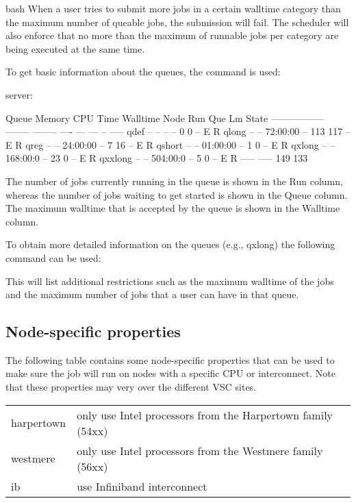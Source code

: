 \begin{code}{bash}
When a user tries to submit more jobs in a certain walltime category than the
maximum number of queable jobs, the submission will fail. The scheduler will
also enforce that no more than the maximum of runnable jobs per category are
being executed at the same time.

To get basic information about the queues, the command  is used:

\begin{prompt}
server: %

Queue      Memory CPU Time Walltime Node  Run Que Lm  State
----------------- -------- -------- ----  --- --- --  -----
qdef         --      --       --      --    0   0 --   E R
qlong        --      --    72:00:00   --  113 117 --   E R
qreg         --      --    24:00:00   --    7  16 --   E R
qshort       --      --    01:00:00   --    1   0 --   E R
qxlong       --      --    168:00:0   --   23   0 --   E R
qxxlong      --      --    504:00:0   --    5   0 --   E R
                                         ----- -----
                                          149  133
\end{prompt}

The number of jobs currently running in the queue is shown in the Run column,
whereas the number of jobs waiting to get started is shown in the Queue column.
The maximum walltime that is accepted by the queue is shown in the Walltime
column.

To obtain more detailed information on the queues (e.g., qxlong) the following
command can be used:

\begin{prompt}
\end{prompt}

This will list additional restrictions such as the maximum walltime of the jobs
and the maximum number of jobs that a user can have in that queue.

\subsection{Node-specific properties}

The following table contains some node-specific properties that can be used to
make sure the job will run on nodes with a specific CPU or interconnect. Note
that these properties may very over the different VSC sites.

\begin{tabular}{|p{0.7in}|p{3.3in}|} \hline
\strong{property} & \strong{explanation}                                        \\ \hline
harpertown        & only use Intel processors from the Harpertown family (54xx) \\ \hline
westmere          & only use Intel processors from the Westmere family (56xx)   \\ \hline
ib                & use Infiniband interconnect                                 \\ \hline
\end{tabular}


\end{code}
